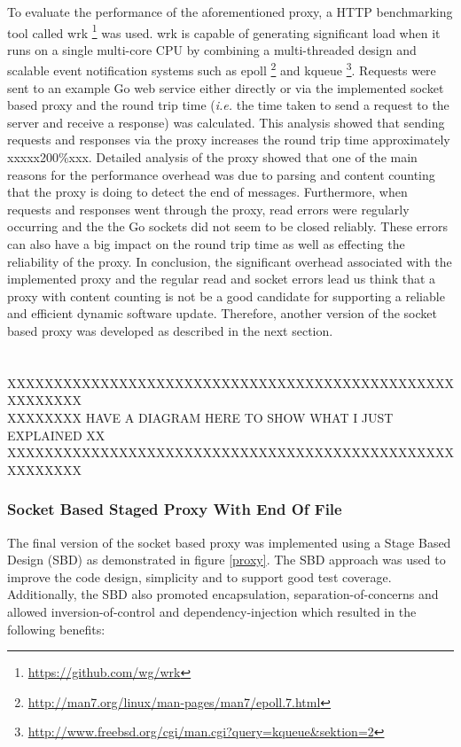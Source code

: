 \documentclass[a4paper,11pt,twoside]{article}
\begin{document}
To evaluate the performance of the aforementioned proxy, a HTTP benchmarking tool called wrk \footnote{\label{wrk} \url{https://github.com/wg/wrk}} was used. wrk is capable of generating significant load when it runs on a single multi-core CPU by combining a multi-threaded design and scalable event notification systems such as epoll \footnote{\label{epoll} \url{http://man7.org/linux/man-pages/man7/epoll.7.html}} and kqueue \footnote{\label{wrk} \url{http://www.freebsd.org/cgi/man.cgi?query=kqueue&sektion=2}}. Requests were sent to an example Go web service either directly or via the implemented socket based proxy and the round trip time (\textit{i.e.} the time taken to send a request to the server and receive a response) was calculated. This analysis showed that sending requests and responses via the proxy increases the round trip time approximately xxxxx200\%xxx. Detailed analysis of the proxy showed that one of the main reasons for the performance overhead was due to parsing and content counting that the proxy is doing to detect the end of messages. Furthermore, when requests and responses went through the proxy, read errors were regularly occurring and the the Go sockets did not seem to be closed reliably. These errors can also have a big impact on the round trip time as well as effecting the reliability of the proxy. In conclusion, the significant overhead associated with the implemented proxy and the regular read and socket errors lead us think that a proxy with content counting  is not be a good candidate for supporting a reliable and efficient dynamic software update. Therefore, another version of the socket based proxy was developed as described in the next section.\\ \\ \\

XXXXXXXXXXXXXXXXXXXXXXXXXXXXXXXXXXXXXXXXXXXXXXXXXXXXXXXX\\
XXXXXXXX HAVE A DIAGRAM HERE TO SHOW WHAT I JUST EXPLAINED XX\\
XXXXXXXXXXXXXXXXXXXXXXXXXXXXXXXXXXXXXXXXXXXXXXXXXXXXXXXX\\    

\subsubsection{Socket Based Staged Proxy With End Of File}
The final version of the socket based proxy was implemented using a Stage Based Design (SBD) as demonstrated in figure \ref{proxy}. The SBD  approach was used to improve the code design, simplicity and to support good test coverage. Additionally, the SBD also promoted encapsulation, separation-of-concerns and allowed inversion-of-control and dependency-injection which resulted in the following benefits:
\end{document}
